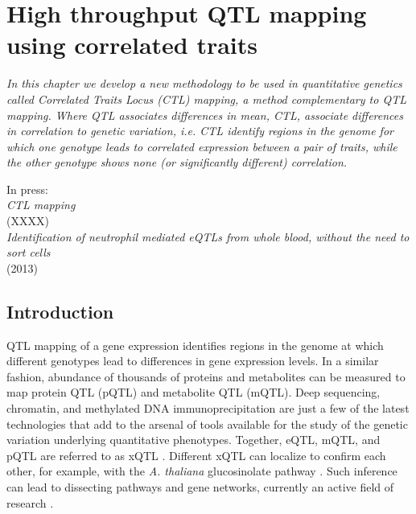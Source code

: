 \chapter{High throughput QTL mapping using correlated traits}
\thispagestyle{empty}
\label{chap:ctlmapping}

\emph{In this chapter we develop a new methodology to be used in quantitative genetics 
called Correlated Traits Locus (CTL) mapping, a method complementary to QTL mapping. 
Where QTL associates differences in mean, CTL, associate differences in correlation to 
genetic variation, i.e. CTL identify regions in the genome for which one genotype leads 
to correlated expression between a pair of traits, while the other genotype shows none 
(or significantly different) correlation.}

\null
\vfill

\begin{myexampleblock}{In press:}
  \\
  \emph{CTL mapping}\\
   (XXXX)
  \\
  \emph{Identification of neutrophil mediated eQTLs from whole blood, without the need to sort cells}\\
   (2013)
\end{myexampleblock}

\newpage

\section{Introduction}
  QTL mapping of a gene expression identifies regions in the genome at which different genotypes lead to differences in gene
  expression levels. In a similar fashion, abundance of thousands of proteins and metabolites can be measured to map protein 
  QTL (pQTL) and metabolite QTL (mQTL). 
  Deep sequencing, chromatin, and methylated DNA immunoprecipitation are just a few of the latest technologies that add to 
  the arsenal of tools available for the study of the genetic variation underlying quantitative phenotypes. Together, eQTL, 
  mQTL, and pQTL are referred to as xQTL \cite{Arends:2012}. Different xQTL can localize to confirm each other, for example, 
  with the \emph{A. thaliana} glucosinolate pathway \cite{Jansen:2009}. Such inference can lead to dissecting pathways and gene networks, 
  currently an active field of research \cite{Prins:2012}.
  
